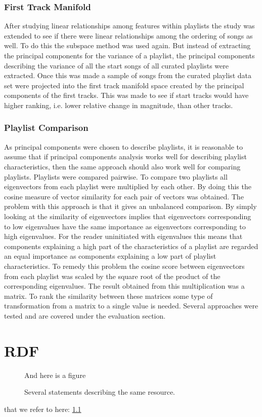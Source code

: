 \documentclass[a4paper,11pt]{kth-mag}
\begin{document}
\subsection{First Track Manifold}
After studying linear relationships among features within playlists the study was extended to see if there were linear relationships among the ordering of songs as well. To do this the subspace method was used again. But instead of extracting the principal components for the variance of a playlist, the principal components describing the variance of all the start songs of all curated playlists were extracted. Once this was made a sample of songs from the curated playlist data set were projected into the first track manifold space created by the principal components of the first tracks. This was made to see if start tracks would have higher ranking, i.e. lower relative change in magnitude, than other tracks.

\subsection{Playlist Comparison}
As principal components were chosen to describe playlists, it is reasonable to assume that if principal components analysis works well for describing playlist characteristics, then the same approach should also work well for comparing playlists. Playlists were compared pairwise. To compare two playlists all eigenvectors from each playlist were multiplied by each other. By doing this the cosine measure of vector similarity for each pair of vectors was obtained. The problem with this approach is that it gives an unbalanced comparison. By simply looking at the similarity of eigenvectors implies that eigenvectors corresponding to low eigenvalues have the same importance as eigenvectors corresponding to high eigenvalues. For the reader uninitiated with eigenvalues this means that components explaining a high part of the characteristics of a playlist are regarded an equal importance as components explaining a low part of playlist characteristics. To remedy this problem the cosine score between eigenvectors from each playlist was scaled by the square root of the product of the corresponding eigenvalues. The result obtained from this multiplication was a matrix. To rank the similarity between these matrices some type of transformation from a matrix to a single value is needed. Several approaches were tested and are covered under the evaluation section.

\appendix
\addappheadtotoc
\chapter{RDF}\label{appA}

\begin{figure}[ht]
\begin{center}
And here is a figure
\caption{\small{Several statements describing the same resource.}}\label{RDF_4}
\end{center}
\end{figure}

that we refer to here: \ref{RDF_4}
\end{document}
